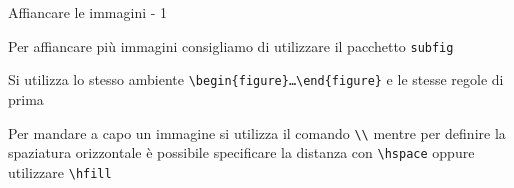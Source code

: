 \begin{frame}{Affiancare le immagini - 1}

Per affiancare più immagini consigliamo di utilizzare il pacchetto 
\texttt{subfig}

\vfill

Si utilizza lo stesso ambiente 
\texttt{\textbackslash{}begin\{figure\}\dots{}\textbackslash{}end\{figure\}}
e le stesse regole di prima

\vfill

Per mandare a capo un immagine si utilizza il comando 
\texttt{\textbackslash{}\textbackslash{}} mentre per definire la spaziatura 
orizzontale è possibile specificare la distanza con 
\texttt{\textbackslash{}hspace} oppure utilizzare \texttt{\textbackslash{}hfill}

\end{frame}